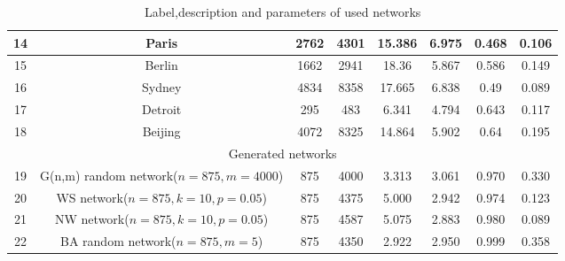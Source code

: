 \documentclass[12pt]{article}
\begin{document}
{\begin{table}[ht]
{\begin{tabular}{|c|c|c|c|c|c|c|c|c|}
            \hline
            14&\multicolumn{2}{c|}{Paris}&2762&4301&15.386&6.975&0.468&0.106\\ 
            \hline
            15&\multicolumn{2}{c|}{Berlin}&1662&2941&18.36&5.867&0.586&0.149\\ 
            \hline
            16&\multicolumn{2}{c|}{Sydney}&4834&8358&17.665&6.838&0.49&0.089\\ 
            \hline
            17&\multicolumn{2}{c|}{Detroit}&295&483&6.341&4.794&0.643&0.117\\ 
            \hline
            18&\multicolumn{2}{c|}{Beijing}&4072&8325&14.864&5.902&0.64&0.195\\ 
            \hline
            \multicolumn{9}{|c|}{Generated networks}\\
            \hline
            19&\multicolumn{2}{c|}{G(n,m) random network($n=875,m=4000$)}&875&4000&3.313&3.061&0.970&0.330\\
            \hline
            20&\multicolumn{2}{c|}{WS network($n=875,k=10,p=0.05$)}&875&4375&5.000&2.942&0.974&0.123\\
            \hline
            21&\multicolumn{2}{c|}{NW network($n=875,k=10,p=0.05$)}&875&4587&5.075&2.883&0.980&0.089\\
            \hline
            22&\multicolumn{2}{c|}{BA random network($n=875,m=5$)}&875&4350&2.922&2.950&0.999&0.358\\
            \hline
        \end{tabular}
    }
    \caption{Label,description and parameters of used networks} 
    \label{tb:descriptions}
\end{table}


}
\end{document}
